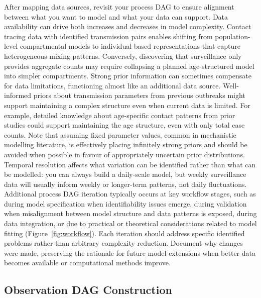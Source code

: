 \documentclass{article}
\begin{document}
After mapping data sources, revisit your process DAG to ensure alignment between what you want to model and what your data can support.
Data availability can drive both increases and decreases in model complexity.
Contact tracing data with identified transmission pairs enables shifting from population-level compartmental models to individual-based representations that capture heterogeneous mixing patterns.
Conversely, discovering that surveillance only provides aggregate counts may require collapsing a planned age-structured model into simpler compartments.
Strong prior information can sometimes compensate for data limitations, functioning almost like an additional data source.
Well-informed priors about transmission parameters from previous outbreaks might support maintaining a complex structure even when current data is limited.
For example, detailed knowledge about age-specific contact patterns from prior studies could support maintaining the age structure, even with only total case counts.
Note that assuming fixed parameter values, common in mechanistic modelling literature, is effectively placing infinitely strong priors and should be avoided when possible in favour of appropriately uncertain prior distributions.
Temporal resolution affects what variation can be identified rather than what can be modelled: you can always build a daily-scale model, but weekly surveillance data will usually inform weekly or longer-term patterns, not daily fluctuations.
Additional process DAG iteration typically occurs at key workflow stages, such as during model specification when identifiability issues emerge, during validation when misalignment between model structure and data patterns is exposed, during data integration, or due to practical or theoretical considerations related to model fitting (Figure~\ref{fig:workflow}).
Each iteration should address specific identified problems rather than arbitrary complexity reduction.
Document why changes were made, preserving the rationale for future model extensions when better data becomes available or computational methods improve.

\subsection{Observation DAG Construction}
\end{document}

